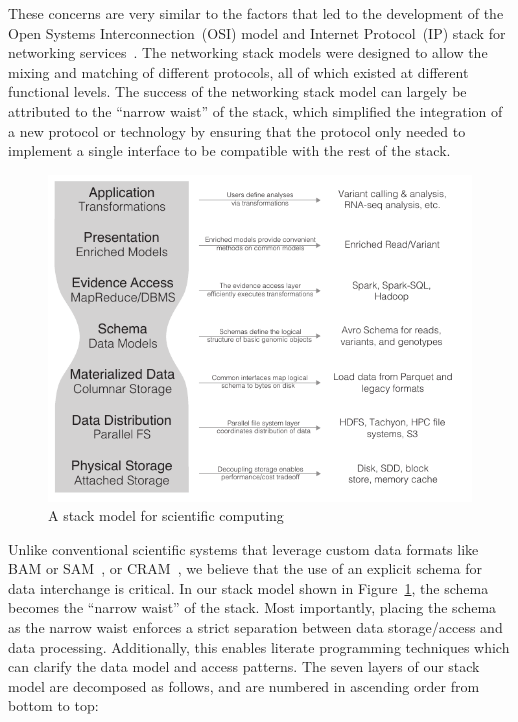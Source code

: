 \documentclass[phd]{ucbthesis}
\begin{document}
These concerns are very similar to the factors that led to the development of the Open Systems
Interconnection~(OSI) model and Internet Protocol~(IP) stack for networking
services~\cite{zimmermann80}. The networking stack models were designed to allow the mixing and
matching of different protocols, all of which existed at different functional levels. The success of the
networking stack model can largely be attributed to the ``narrow waist'' of the stack, which simplified the
integration of a new protocol or technology by ensuring that the protocol only needed to implement a
single interface to be compatible with the rest of the stack.

\begin{figure}[h]
\begin{center}
\includegraphics{graphs/expanded-stack-2.pdf}
\end{center}
\caption{A stack model for scientific computing}
\label{fig:stack-model}
\end{figure}

Unlike conventional scientific systems that leverage custom data formats like BAM or SAM~\cite{li09},
or CRAM~\cite{fritz11}, we believe that the use of an explicit schema for data interchange is critical.
In our stack model shown in Figure~\ref{fig:stack-model}, the schema becomes the ``narrow waist''
of the stack. Most importantly, placing the schema as the narrow waist enforces a strict separation
between data storage/access and data processing. Additionally, this enables literate programming
techniques which can clarify the data model and access patterns. The seven layers of our stack model
are decomposed as follows, and are numbered in ascending order from bottom to top:
\end{document}
